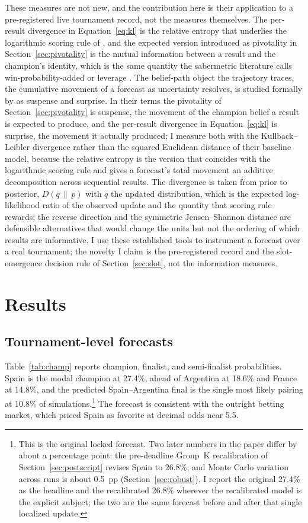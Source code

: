 \documentclass[11pt,letterpaper]{article}
\begin{document}
These measures are not new, and the contribution here is their application to a pre-registered live tournament record, not the measures themselves. The per-result divergence in Equation~\eqref{eq:kl} is the relative entropy that underlies the logarithmic scoring rule of \citet{gneiting2007}, and the expected version introduced as pivotality in Section~\ref{sec:pivotality} is the mutual information between a result and the champion's identity, which is the same quantity the sabermetric literature calls win-probability-added or leverage \citep{tango2007}. The belief-path object the trajectory traces, the cumulative movement of a forecast as uncertainty resolves, is studied formally by \citet{ely2015} as suspense and surprise. In their terms the pivotality of Section~\ref{sec:pivotality} is suspense, the movement of the champion belief a result is expected to produce, and the per-result divergence in Equation~\eqref{eq:kl} is surprise, the movement it actually produced; I measure both with the Kullback--Leibler divergence rather than the squared Euclidean distance of their baseline model, because the relative entropy is the version that coincides with the logarithmic scoring rule and gives a forecast's total movement an additive decomposition across sequential results. The divergence is taken from prior to posterior, $D(q \,\|\, p)$ with $q$ the updated distribution, which is the expected log-likelihood ratio of the observed update and the quantity that scoring rule rewards; the reverse direction and the symmetric Jensen--Shannon distance are defensible alternatives that would change the units but not the ordering of which results are informative. I use these established tools to instrument a forecast over a real tournament; the novelty I claim is the pre-registered record and the slot-emergence decision rule of Section~\ref{sec:slot}, not the information measures.

\section{Results}

\subsection{Tournament-level forecasts}

Table~\ref{tab:champ} reports champion, finalist, and semi-finalist probabilities. Spain is the modal champion at 27.4\%, ahead of Argentina at 18.6\% and France at 14.8\%, and the predicted Spain--Argentina final is the single most likely pairing at 10.8\% of simulations.\footnote{This is the original locked forecast. Two later numbers in the paper differ by about a percentage point: the pre-deadline Group~K recalibration of Section~\ref{sec:postscript} revises Spain to 26.8\%, and Monte Carlo variation across runs is about 0.5~pp (Section~\ref{sec:robust}). I report the original 27.4\% as the headline and the recalibrated 26.8\% wherever the recalibrated model is the explicit subject; the two are the same forecast before and after that single localized update.} The forecast is consistent with the outright betting market, which priced Spain as favorite at decimal odds near 5.5.
\end{document}
